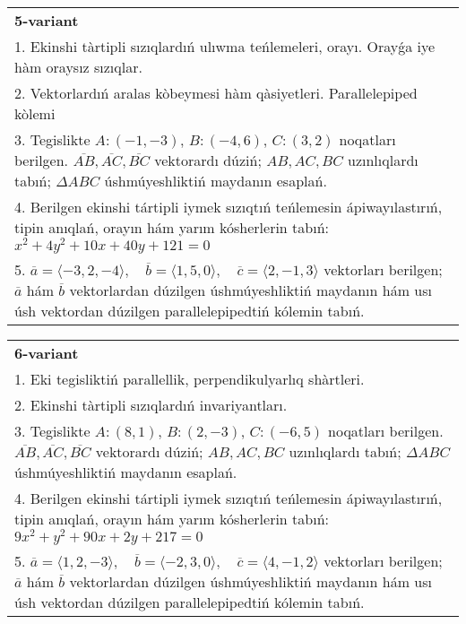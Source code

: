 \documentclass{article}
\begin{document}
\begin{tabular}{m{17cm}}
\textbf{5-variant}\\
1. Ekinshi tàrtipli sızıqlardıń ulıwma teńlemeleri, orayı. Orayǵa iye hàm oraysız sızıqlar.\\

2. Vektorlardıń aralas kòbeymesi hàm qàsiyetleri. Parallelepiped kòlemi\\

3. Tegislikte $A: (-1, -3)$, $B: (-4, 6)$, $C: (3, 2)$ noqatları berilgen. $\overline{AB}, \overline{AC}, \overline{BC}$ vektorardı dúziń; $AB, AC, BC$ uzınlıqlardı tabıń; $\Delta ABC$ úshmúyeshliktiń maydanın esaplań. \\

4. Berilgen ekinshi tártipli iymek sızıqtıń teńlemesin ápiwayılastırıń, tipin anıqlań, orayın hám yarım kósherlerin tabıń: $x^2+4y^2+10x+40y+121=0$\\

5. \(\overline{a} = \langle -3, 2, -4 \rangle, \quad \overline{b} = \langle 1, 5, 0 \rangle, \quad \overline{c} = \langle 2, -1, 3 \rangle\) vektorları berilgen; \(\overline{a}\) hám \(\overline{b}\) vektorlardan dúzilgen úshmúyeshliktiń maydanın hám usı úsh vektordan dúzilgen parallelepipedtiń kólemin tabıń.
\end{tabular}
\vspace{1cm}


\begin{tabular}{m{17cm}}
\textbf{6-variant}\\
1. Eki tegisliktiń parallellik, perpendikulyarlıq shàrtleri.\\

2. Ekinshi tàrtipli sızıqlardıń invariyantları.\\

3. Tegislikte $A: (8, 1)$, $B: (2, -3)$, $C: (-6, 5)$ noqatları berilgen. $\overline{AB}, \overline{AC}, \overline{BC}$ vektorardı dúziń; $AB, AC, BC$ uzınlıqlardı tabıń; $\Delta ABC$ úshmúyeshliktiń maydanın esaplań. \\

4. Berilgen ekinshi tártipli iymek sızıqtıń teńlemesin ápiwayılastırıń, tipin anıqlań, orayın hám yarım kósherlerin tabıń: $9x^2+y^2+90x+2y+217=0$\\

5. \(\overline{a} = \langle 1, 2, -3 \rangle, \quad \overline{b} = \langle -2, 3, 0 \rangle, \quad \overline{c} = \langle 4, -1, 2 \rangle\) vektorları berilgen; \(\overline{a}\) hám \(\overline{b}\) vektorlardan dúzilgen úshmúyeshliktiń maydanın hám usı úsh vektordan dúzilgen parallelepipedtiń kólemin tabıń.
\end{tabular}
\vspace{1cm}
\end{document}
